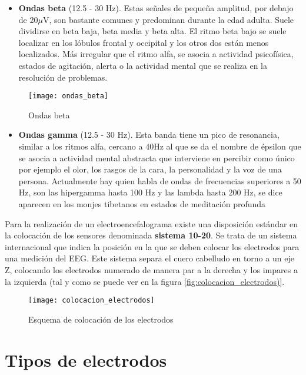 \begin{itemize}
\item\textbf{Ondas beta} (12.5 - 30 Hz). Estas señales de pequeña amplitud, por debajo de 20$\mu$V, son bastante comunes y predominan durante la edad adulta. Suele dividirse en beta baja, beta media y beta alta. El ritmo beta bajo se suele localizar en los lóbulos frontal y occipital y los otros dos están menos localizados. Más irregular que el ritmo alfa, se asocia a actividad psicofísica, estados de agitación, alerta o la actividad mental que se realiza en la resolución de problemas.
\end{itemize}
\begin{figure} [H]
    \centering
    \texttt{[image: ondas\_beta]}
    \caption{Ondas beta \cite{apuntes}}
    \label{fig:ondas_beta}
\end{figure}

\begin{itemize}
\item\textbf{Ondas gamma} (12.5 - 30 Hz). Esta banda tiene un pico de resonancia, similar a los ritmos alfa, cercano a 40Hz al que se da el nombre de épsilon que se asocia a actividad mental abstracta que interviene en percibir como único por ejemplo el olor, los rasgos de la cara, la personalidad y la voz de una persona. Actualmente hay quien habla de ondas de frecuencias superiores a 50 Hz, son las hipergamma hasta 100 Hz y las lambda hasta 200 Hz, se dice aparecen en los monjes tibetanos en estados de meditación profunda
\end{itemize}

Para la realización de un electroencefalograma existe una disposición estándar en la colocación de los sensores denominada \textbf{sistema 10-20}. Se trata de un sistema internacional que indica la posición en la que se deben colocar los electrodos para una medición del \acrshort{EEG}.  Este sistema separa el cuero cabelludo en torno a un eje Z, colocando los electrodos numerado de manera par a la derecha y los impares a la izquierda (tal y como se puede ver en la figura \ref{fig:colocacion_electrodos)}.

\begin{figure} [H]
    \centering
    \texttt{[image: colocacion\_electrodos]}
    \caption{Esquema de colocación de los electrodos}
    \label{fig:colocacion_electrodos}
\end{figure}

\clearpage

\section{Tipos de electrodos\label{sec:Tipos_Electrodos}}

